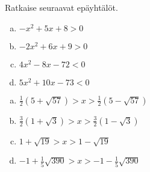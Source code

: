% 
% 
% 

\Harjoitustehtavat

\begin{tehtava}
    Ratkaise seuraavat epäyhtälöt.
    \begin{enumerate}[(a)]
        \item $-x^2+5x+8>0$
        \item $-2x^2+6x+9>0$
        \item $4x^2-8x-72<0$
        \item $5x^2+10x-73<0$
    \end{enumerate}
    \begin{vastaus}
        \begin{enumerate}[(a)]
            \item $\frac{1}{2} (5+\sqrt{57}) > x > \frac{1}{2} (5-\sqrt{57})$
            \item $\frac{3}{2} (1+\sqrt{3}) > x > \frac{3}{2} (1-\sqrt{3})$
            \item $1+\sqrt{19} > x > 1-\sqrt{19}$
            \item $-1+\frac{1}{5} \sqrt{390} > x > -1-\frac{1}{5} \sqrt{390}$
        \end{enumerate}
    \end{vastaus}
\end{tehtava}

